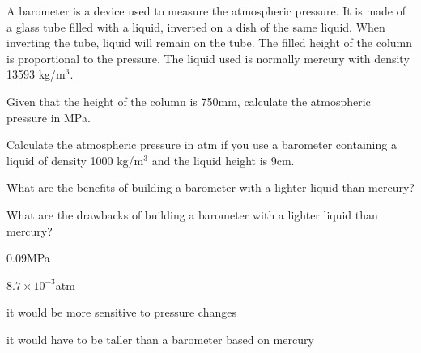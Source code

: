 \documentclass[main.tex]{subfiles}
\begin{document}
\begin{multicols*}{2}
\begin{question}[ID=\the\value{numA}]
A barometer is a device used to measure the atmospheric pressure. It is made of a glass tube filled with a liquid, inverted on a dish of the same liquid. When inverting the tube, liquid will remain on the tube. The filled height of the column is proportional to the pressure. The liquid used is normally mercury with density 13593 kg/$\text{m}^3$.
\begin{center}\end{center}
\begin{inparaenum}[(a)]	
\item  Given that the height of the column is 750mm, calculate the atmospheric pressure in MPa.
\item  Calculate the atmospheric pressure in atm if you use a barometer containing a liquid of density 1000 kg/$\text{m}^3$ and the liquid height is 9cm.
\item  What are the benefits of building a barometer with a lighter liquid than mercury?
\item  What are the drawbacks of building a barometer with a lighter liquid than mercury?
\end{inparaenum} 
\end{question}
\begin{solution}
\begin{inparaenum}[(a)]	
\item   0.09MPa
\item   $8.7\times 10^{-3}$atm
\item  it would be more sensitive to pressure changes
\item   it would have to be taller than a barometer based on mercury
\end{inparaenum} 
\hspace{0.1cm}\end{solution}%






\end{multicols*}
\end{document}
